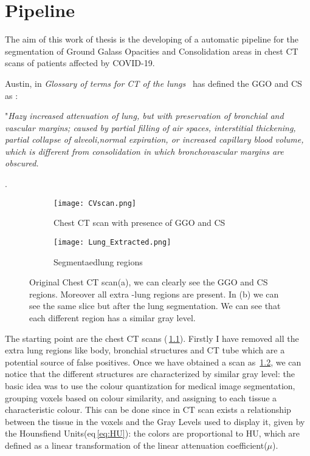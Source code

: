 \documentclass{standalone}
\begin{document}
	\chapter{Pipeline}
	
	The aim of this work of thesis is the developing of a automatic pipeline for the segmentation of Ground Galass Opacities and Consolidation areas in chest CT scans of patients affected by COVID-19.
	
	Austin, in \textit{Glossary of terms for CT of the lungs}~\cite{ART:Austin} has defined the GGO and CS as : 
	\begin{center}
		"\emph{Hazy increased attenuation of lung, but with preservation of bronchial and vascular margins; caused by partial filling of air spaces, interstitial thickening, partial collapse of alveoli,normal expiration, or increased capillary blood volume, which is different from consolidation in which bronchovascular margins are obscured.}
	\end{center}. 

	\begin{figure}[ht]
		\begin{subfigure}{.5\textwidth}
			\centering
			\texttt{[image: CVscan.png]}  
			\caption{Chest CT scan with presence of GGO and CS}
			\label{fig:CTscan}
		\end{subfigure}
		\begin{subfigure}{.5\textwidth}
			\centering
			\texttt{[image: Lung\_Extracted.png]}  
			\caption{Segmentaedlung regions}
			\label{fig:lung}
		\end{subfigure}
		\caption{Original Chest CT scan(a), we can clearly see the GGO and CS regions. Moreover all extra -lung regions are present. In (b) we can see the same slice but after the lung segmentation. We can see that each different region has a similar gray level.}
		\label{fig:CTLung}
	\end{figure}


	The starting point are the chest CT scans (\figurename\,\ref{fig:CTscan}). Firstly I have removed all the extra lung regions like body, bronchial structures and CT tube which are a potential source of false positives. Once we have obtained a scan as \figurename\,\ref{fig:lung}, we can notice that  the different structures are characterized by similar gray level: the basic idea was to use the colour quantization for medical image segmentation, grouping voxels based on colour similarity, and  assigning  to each tissue a characteristic colour. This can be done since in CT scan exists a relationship between the tissue in the voxels and the Gray Levels used to display it, given by the Hounsfiend Units(eq\,\ref{eq:HU}): the colors are proportional to HU, which are defined as a linear transformation of the linear attenuation coefficient($\mu$).
	
\end{document}
